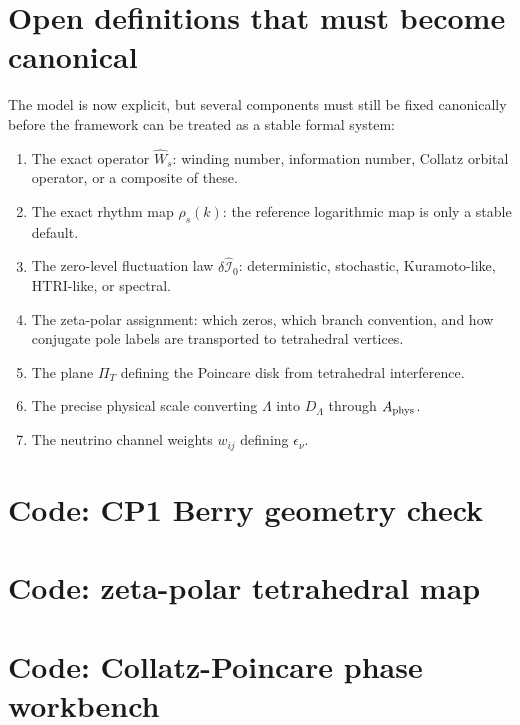 \documentclass[11pt,a4paper]{article}
\begin{document}
\section{Open definitions that must become canonical}
The model is now explicit, but several components must still be fixed canonically before the framework can be treated as a stable formal system:
\begin{enumerate}[leftmargin=*]
\item The exact operator $\hat W_s$: winding number, information number, Collatz orbital operator, or a composite of these.
\item The exact rhythm map $\rho_s(k)$: the reference logarithmic map is only a stable default.
\item The zero-level fluctuation law $\delta\hat{\mathcal I}_0$: deterministic, stochastic, Kuramoto-like, HTRI-like, or spectral.
\item The zeta-polar assignment: which zeros, which branch convention, and how conjugate pole labels are transported to tetrahedral vertices.
\item The plane $\Pi_T$ defining the Poincare disk from tetrahedral interference.
\item The precise physical scale converting $\Lambda$ into $D_\Lambda$ through $A_{\rm phys}$.
\item The neutrino channel weights $w_{ij}$ defining $\epsilon_\nu$.
\end{enumerate}

\appendix
\newpage
\section{Code: CP1 Berry geometry check}


\newpage
\section{Code: zeta-polar tetrahedral map}


\newpage
\section{Code: Collatz-Poincare phase workbench}

\end{document}
